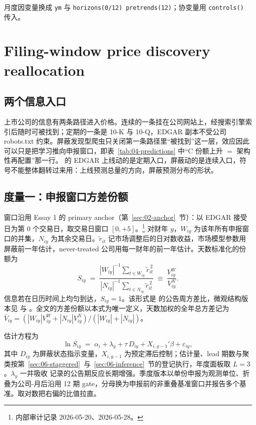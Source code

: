 \documentclass[a4paper,11pt]{ctexart}
\begin{document}
月度因变量换成 \texttt{ym} 与 \texttt{horizons(0/12) pretrends(12)}；协变量用 \texttt{controls()} 传入。
\clearpage

\section{Filing-window price discovery reallocation}\label{sec:07-reallocation}

\subsection{两个信息入口}\label{sec:07-entries}

上市公司的信息有两条路径进入价格。连续的一条挂在公司网站上，经搜索引擎索引后随时可被找到；定期的一条是 10-K 与 10-Q，EDGAR 副本不受公司 robots.txt 约束。屏蔽发现型爬虫只关闭第一条路径里“被找到”这一层\citep{hubermanregev2001,engelbergparsons2011}，效应因此可以只是把学习推向申报窗口，即表~\ref{tab:04-predictions} 中“C 份额上升 $=$ 架构性再配置”那一行。\citet{gaohuang2020} 的 EDGAR 上线动的是定期入口，屏蔽动的是连续入口，符号不能整体翻转过来用：上线预测总量的方向，屏蔽预测分布的形状。

\subsection{度量一：申报窗口方差份额}\label{sec:07-share}

窗口沿用 Essay 1 的 primary anchor（第~\ref{sec:02-anchor}~节）：以 EDGAR 接受日为第 0 个交易日，取交易日窗口 $[0,+5]$。\footnote{内部审计记录 2026-05-20、2026-05-28。} 对财年 $y$，$W_{iy}$ 为该年所有申报窗口的并集，$N_{iy}$ 为其余交易日。$\tilde r_{it}$ 记市场调整后的日对数收益，市场模型参数用屏蔽前一年估计，never-treated 公司用每一财年的前一年估计。天数标准化的份额为
\begin{equation}\label{eq:07-share}
S_{iy} \;=\; \frac{|W_{iy}|^{-1}\sum_{t\in W_{iy}} \tilde r_{it}^{\,2}}{|N_{iy}|^{-1}\sum_{t\in N_{iy}} \tilde r_{it}^{\,2}} \;\equiv\; \frac{V^{W}_{iy}}{V^{N}_{iy}} .
\end{equation}
信息若在日历时间上均匀到达，$S_{iy}=1$。该形式是 \citet{beaver1968} 的公告周方差比，微观结构版本见 \citet{leemucklowready1993} 与 \citet{krinskylee1996}。全文的方差份额以本式为唯一定义，天数加权的全年总方差记为 $\bar V_{iy}=(|W_{iy}|V^{W}_{iy}+|N_{iy}|V^{N}_{iy})/(|W_{iy}|+|N_{iy}|)$。

估计方程为
\begin{equation}\label{eq:07-did}
\ln S_{iy} \;=\; \alpha_i + \lambda_y + \tau\, D_{iy} + X_{i,y-1}'\beta + \varepsilon_{iy},
\end{equation}
其中 $D_{iy}$ 为屏蔽状态指示变量，$X_{i,y-1}$ 为预定滞后控制；估计量、lead 期数与聚类按第~\ref{sec:06-staggered}~与~\ref{sec:06-inference}~节的登记执行，年度面板取 $L=3$。$\lambda_y$ 一并吸收 \citet{beavermcnicholswang2020} 记录的公告期反应长期增强。季度版本以单份申报为观测单位、折叠为公司-月后沿用 12 期 gate，分母换为申报前的非重叠基准窗口并报告多个基准。取对数把右偏的比值拉直。
\end{document}
